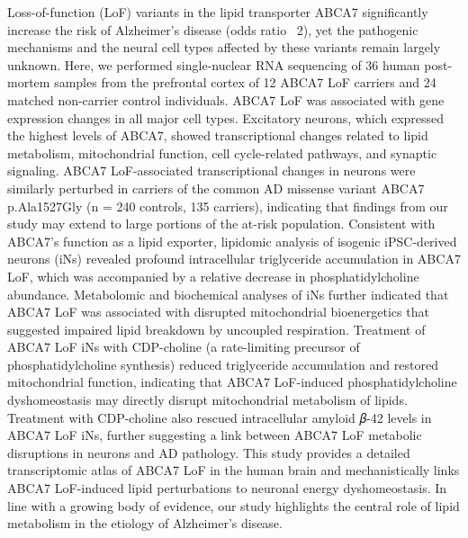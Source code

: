 Loss-of-function (LoF) variants in the lipid transporter ABCA7 significantly increase the risk of Alzheimer’s disease (odds ratio ~2), yet the pathogenic mechanisms and the neural cell types affected by these variants remain largely unknown. Here, we performed single-nuclear RNA sequencing of 36 human post-mortem samples from the prefrontal cortex of 12 ABCA7 LoF carriers and 24 matched non-carrier control individuals. ABCA7 LoF was associated with gene expression changes in all major cell types. Excitatory neurons, which expressed the highest levels of ABCA7, showed transcriptional changes related to lipid metabolism, mitochondrial function, cell cycle-related pathways, and synaptic signaling. ABCA7 LoF-associated transcriptional changes in neurons were similarly perturbed in carriers of the common AD missense variant ABCA7 p.Ala1527Gly (n = 240 controls, 135 carriers), indicating that findings from our study may extend to large portions of the at-risk population. Consistent with ABCA7’s function as a lipid exporter, lipidomic analysis of isogenic iPSC-derived neurons (iNs) revealed profound intracellular triglyceride accumulation in ABCA7 LoF, which was accompanied by a relative decrease in phosphatidylcholine abundance. Metabolomic and biochemical analyses of iNs further indicated that ABCA7 LoF was associated with disrupted mitochondrial bioenergetics that suggested impaired lipid breakdown by uncoupled respiration. Treatment of ABCA7 LoF iNs with CDP-choline (a rate-limiting precursor of phosphatidylcholine synthesis) reduced triglyceride accumulation and restored mitochondrial function, indicating that ABCA7 LoF-induced phosphatidylcholine dyshomeostasis may directly disrupt mitochondrial metabolism of lipids. Treatment with CDP-choline also rescued intracellular amyloid 𝛽-42 levels in ABCA7 LoF iNs, further suggesting a link between ABCA7 LoF metabolic disruptions in neurons and AD pathology. This study provides a detailed transcriptomic atlas of ABCA7 LoF in the human brain and mechanistically links ABCA7 LoF-induced lipid perturbations to neuronal energy dyshomeostasis. In line with a growing body of evidence, our study highlights the central role of lipid metabolism in the etiology of Alzheimer’s disease.

